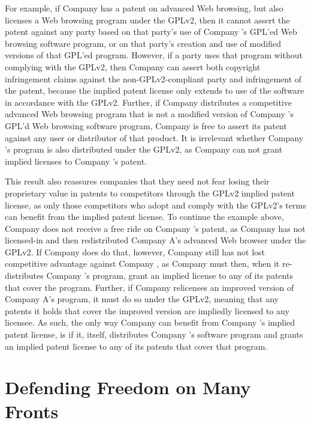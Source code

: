 For example, if Company \compA{} has a patent on advanced Web browsing, but
also licenses a Web browsing program under the GPLv2, then it
cannot assert the patent against any party based on that party's use of 
Company \compA{}'s GPL'ed Web browsing software program, or on that party's
creation and use of modified versions of that GPL'ed program.  However, if a
party uses that program without
complying with the GPLv2, then Company \compA{} can assert both copyright
infringement claims against the non-GPLv2-compliant party and
infringement of the patent, because the implied patent license only
extends to use of the software in accordance with the GPLv2. Further, if
Company \compB{} distributes a competitive advanced Web browsing program 
that is not a modified version of Company \compA{}'s GPL'd Web browsing software
program, Company \compA{} is free to assert its patent against any user or
distributor of that product. It is irrelevant whether Company \compB's
program is also distributed under the GPLv2, as Company \compB{} can not grant
implied licenses to Company \compA's patent.

This result also reassures companies that they need not fear losing their
proprietary value in patents to competitors through the GPLv2 implied patent
license, as only those competitors who adopt and comply with the GPLv2's
terms can benefit from the implied patent license. To continue the
example above, Company \compB{} does not receive a free ride on Company
\compA's patent, as Company \compB{} has not licensed-in and then
redistributed Company A's advanced Web browser under the GPLv2. If Company
\compB{} does do that, however, Company \compA{} still has not lost
competitive advantage against Company \compB{}, as Company \compB{} must then,
when it re-distributes Company \compA's program, grant an implied license
to any of its patents that cover the program. Further, if Company \compB{}
relicenses an improved version of Company A's program, it must do so under
the GPLv2, meaning that any patents it holds that cover the improved version
are impliedly licensed to any licensee. As such, the only way Company
\compB{} can benefit from Company \compA's implied patent license, is if it,
itself, distributes Company \compA's software program and grants an
implied patent license to any of its patents that cover that program.

\chapter{Defending Freedom on Many Fronts}


